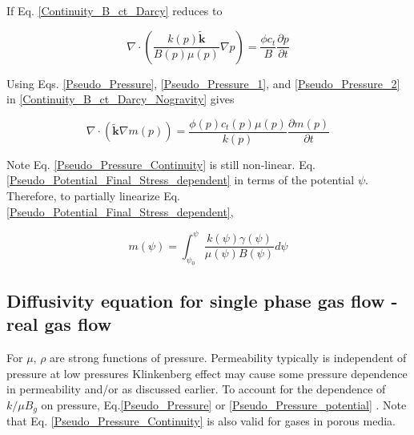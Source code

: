 \documentclass{llncs}
\numberwithin{equation}{section}
\numberwithin{figure}{section}
\numberwithin{table}{section}
\begin{document}
    If  Eq. \ref{Continuity_B_ct_Darcy} reduces to
    
    \begin{equation}
        \nabla \cdot \left( \frac{k\left( p \right)\widetilde{\mathbf{k}}}{B\left( p \right)\mu \left( p \right)}\nabla p \right)=\frac{\phi {{c}_{t}}}{B}\frac{\partial p}{\partial t}
    \label{Continuity_B_ct_Darcy_Nogravity}
    \end{equation}     
    
    Using Eqs. \ref{Pseudo_Pressure}, \ref{Pseudo_Pressure_1}, and \ref{Pseudo_Pressure_2} in \ref{Continuity_B_ct_Darcy_Nogravity} gives

    \begin{equation}
        \nabla \cdot \left( \widetilde{\mathbf{k}}\nabla m\left( p \right) \right)=\frac{\phi \left( p \right){{c}_{t}}\left( p \right)\mu \left( p \right)}{k\left( p \right)}\frac{\partial m\left( p \right)}{\partial t}
    \label{Pseudo_Pressure_Continuity}
    \end{equation}     
    
    Note Eq. \ref{Pseudo_Pressure_Continuity} is still non-linear.  Eq. \ref{Pseudo_Potential_Final_Stress_dependent}  in terms of the potential $\psi$. Therefore, to partially linearize Eq. \ref{Pseudo_Potential_Final_Stress_dependent}, 
   
    \begin{equation}
        m\left( \psi  \right)=\int_{{{\psi }_{0}}}^{\psi }{\frac{k\left( \psi  \right)\gamma \left( \psi  \right)}{\mu \left( \psi  \right)B\left( \psi  \right)}d\psi }
    \label{Pseudo_Pressure_potential}
    \end{equation}     
   
    \subsection{Diffusivity equation for single phase gas flow - real gas flow}
    For  $\mu$, $\rho$ are strong functions of pressure. Permeability typically is independent of pressure at low pressures Klinkenberg effect may cause some pressure dependence in permeability and/or  as discussed earlier. To account for the dependence of $k/ \mu B_{g}$ on pressure, Eq.\ref{Pseudo_Pressure} or \ref{Pseudo_Pressure_potential} . Note that Eq. \ref{Pseudo_Pressure_Continuity} is also valid for  gases in porous media.\\
    
\end{document}
